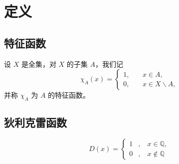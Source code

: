 \chapter{定义}
	\section{特征函数}
		设 $X$ 是全集，对 $X$ 的子集 $A$，我们记 
		$$
		\chi_A(x)=\left\{ 
			\begin{aligned}
				1, &\  & x \in A, \\ 
				0, &\  & x\in X \backslash A,
			\end{aligned}
			\right.
		$$
		并称 $\chi_A$ 为 $A$ 的特征函数。
	\section{狄利克雷函数}
	$$
	D(x)=\left\{
	\begin{aligned}
		1 &,\ & x \in \mathbb{Q}, \\
		0 &,\ & x \notin \mathbb{Q}
	\end{aligned}
	\right.
	$$